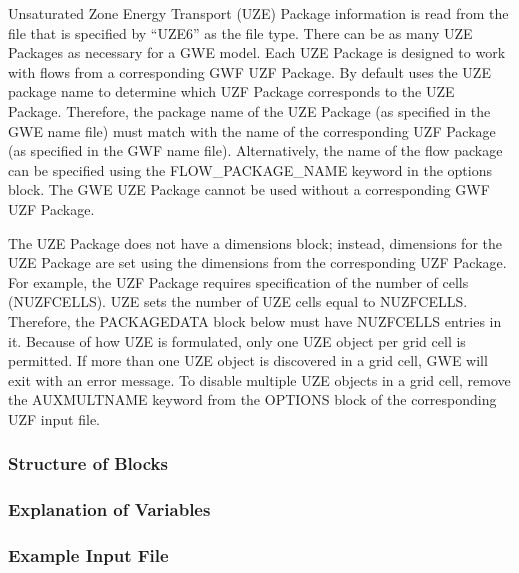Unsaturated Zone Energy Transport (UZE) Package information is read from the file that is specified by ``UZE6'' as the file type.  There can be as many UZE Packages as necessary for a GWE model. Each UZE Package is designed to work with flows from a corresponding GWF UZF Package. By default \mf uses the UZE package name to determine which UZF Package corresponds to the UZE Package.  Therefore, the package name of the UZE Package (as specified in the GWE name file) must match with the name of the corresponding UZF Package (as specified in the GWF name file).  Alternatively, the name of the flow package can be specified using the FLOW\_PACKAGE\_NAME keyword in the options block.  The GWE UZE Package cannot be used without a corresponding GWF UZF Package.

The UZE Package does not have a dimensions block; instead, dimensions for the UZE Package are set using the dimensions from the corresponding UZF Package.  For example, the UZF Package requires specification of the number of cells (NUZFCELLS).  UZE sets the number of UZE cells equal to NUZFCELLS.  Therefore, the PACKAGEDATA block below must have NUZFCELLS entries in it.  Because of how UZE is formulated, only one UZE object per grid cell is permitted.  If more than one UZE object is discovered in a grid cell, GWE will exit with an error message.  To disable multiple UZE objects in a grid cell, remove the AUXMULTNAME keyword from the OPTIONS block of the corresponding UZF input file.

\vspace{5mm}
\subsubsection{Structure of Blocks}




\vspace{5mm}
\subsubsection{Explanation of Variables}
\begin{description}

\end{description}

\vspace{5mm}
\subsubsection{Example Input File}


